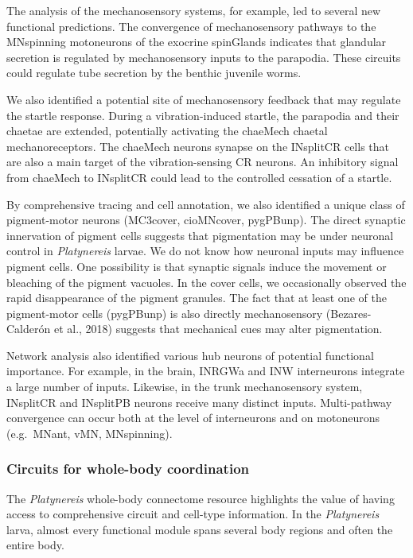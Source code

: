 \documentclass[
  11pt,
]{article}
\begin{document}
The analysis of the mechanosensory systems, for example, led to several
new functional predictions. The convergence of mechanosensory pathways
to the MNspinning motoneurons of the exocrine spinGlands indicates that
glandular secretion is regulated by mechanosensory inputs to the
parapodia. These circuits could regulate tube secretion by the benthic
juvenile worms.

We also identified a potential site of mechanosensory feedback that may
regulate the startle response. During a vibration-induced startle, the
parapodia and their chaetae are extended, potentially activating the
chaeMech chaetal mechanoreceptors. The chaeMech neurons synapse on the
INsplitCR cells that are also a main target of the vibration-sensing CR
neurons. An inhibitory signal from chaeMech to INsplitCR could lead to
the controlled cessation of a startle.

By comprehensive tracing and cell annotation, we also identified a
unique class of pigment-motor neurons (MC3cover, cioMNcover, pygPBunp).
The direct synaptic innervation of pigment cells suggests that
pigmentation may be under neuronal control in \emph{Platynereis} larvae.
We do not know how neuronal inputs may influence pigment cells. One
possibility is that synaptic signals induce the movement or bleaching of
the pigment vacuoles. In the cover cells, we occasionally observed the
rapid disappearance of the pigment granules. The fact that at least one
of the pigment-motor cells (pygPBunp) is also directly mechanosensory
(Bezares-Calderón et al., 2018) suggests that mechanical cues may alter
pigmentation.

Network analysis also identified various hub neurons of potential
functional importance. For example, in the brain, INRGWa and INW
interneurons integrate a large number of inputs. Likewise, in the trunk
mechanosensory system, INsplitCR and INsplitPB neurons receive many
distinct inputs. Multi-pathway convergence can occur both at the level
of interneurons and on motoneurons (e.g.~MNant, vMN, MNspinning).

\subsubsection{Circuits for whole-body
coordination}\label{circuits-for-whole-body-coordination}

The \emph{Platynereis} whole-body connectome resource highlights the
value of having access to comprehensive circuit and cell-type
information. In the \emph{Platynereis} larva, almost every functional
module spans several body regions and often the entire body.
\end{document}
